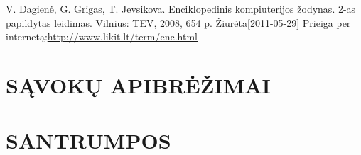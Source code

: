 \documentclass[12pt,a4paper,titlepage]{article}
\begin{document}
\begin{thebibliography}{99}
V. Dagienė, G. Grigas, T. Jevsikova. Enciklopedinis kompiuterijos žodynas. 2-as papildytas leidimas. Vilnius: TEV, 2008, 654 p. Žiūrėta[2011-05-29] Prieiga per internetą:\url{http://www.likit.lt/term/enc.html}

\end{thebibliography}

\section*{SĄVOKŲ APIBRĖŽIMAI}

\section*{SANTRUMPOS}
\end{document}
